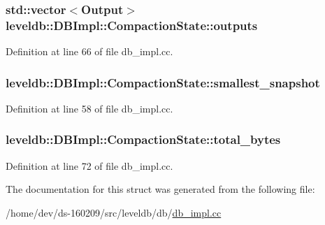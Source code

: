 \subsubsection[{outputs}]{\setlength{\rightskip}{0pt plus 5cm}std\+::vector$<${\bf Output}$>$ leveldb\+::\+D\+B\+Impl\+::\+Compaction\+State\+::outputs}\label{structleveldb_1_1_d_b_impl_1_1_compaction_state_acce338739aafdfa40083ae3d5aacf24a}


Definition at line 66 of file db\+\_\+impl.\+cc.

\hypertarget{structleveldb_1_1_d_b_impl_1_1_compaction_state_a725f0984b8372c51691d72f66672dc89}{}
\subsubsection[{smallest\+\_\+snapshot}]{ leveldb\+::\+D\+B\+Impl\+::\+Compaction\+State\+::smallest\+\_\+snapshot}\label{structleveldb_1_1_d_b_impl_1_1_compaction_state_a725f0984b8372c51691d72f66672dc89}


Definition at line 58 of file db\+\_\+impl.\+cc.

\hypertarget{structleveldb_1_1_d_b_impl_1_1_compaction_state_a21aa7304978dffc6841c4c11761f4b71}{}
\subsubsection[{total\+\_\+bytes}]{ leveldb\+::\+D\+B\+Impl\+::\+Compaction\+State\+::total\+\_\+bytes}\label{structleveldb_1_1_d_b_impl_1_1_compaction_state_a21aa7304978dffc6841c4c11761f4b71}


Definition at line 72 of file db\+\_\+impl.\+cc.



The documentation for this struct was generated from the following file\+:\begin{DoxyCompactItemize}
\item 
/home/dev/ds-\/160209/src/leveldb/db/\hyperlink{db__impl_8cc}{db\+\_\+impl.\+cc}\end{DoxyCompactItemize}
